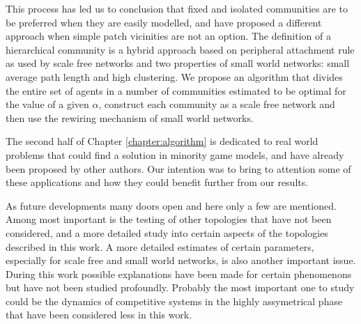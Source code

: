 This process has led us to conclusion that fixed and isolated communities are to be preferred when they are easily modelled, and have proposed a different approach when simple patch vicinities are not an option.
The definition of a hierarchical community is a hybrid approach based on peripheral attachment rule as used by scale free networks and two properties of small world networks: small average path length and high clustering.
We propose an algorithm that divides the entire set of agents in a number of communities estimated to be optimal for the value of a given $\alpha$, construct each community as a scale free network and then use the rewiring mechanism of small world networks.

The second half of Chapter \ref{chapter:algorithm} is dedicated to real world problems that could find a solution in minority game models, and have already been proposed by other authors.
Our intention was to bring to attention some of these applications and how they could benefit further from our results.

As future developments many doors open and here only a few are mentioned.
Among most important is the testing of other topologies that have not been considered, and a more detailed study into certain aspects of the topologies described in this work.
A more detailed estimates of certain parameters, especially for scale free and small world networks, is also another important issue.
During this work possible explanations have been made for certain phenomenons but have not been studied profoundly.
Probably the most important one to study could be the dynamics of competitive systems in the highly assymetrical phase that have been considered less in this work.
